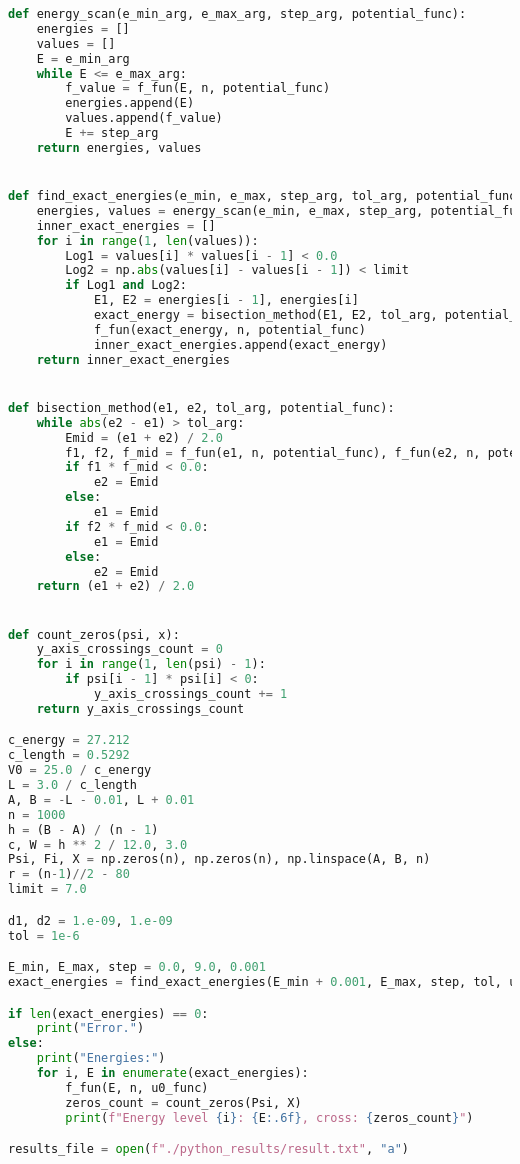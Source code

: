 \begin{lstlisting}[language=Python, caption=Код файла solver.py,label={lst:solver}]
def energy_scan(e_min_arg, e_max_arg, step_arg, potential_func):
    energies = []
    values = []
    E = e_min_arg
    while E <= e_max_arg:
        f_value = f_fun(E, n, potential_func)
        energies.append(E)
        values.append(f_value)
        E += step_arg
    return energies, values


def find_exact_energies(e_min, e_max, step_arg, tol_arg, potential_func):
    energies, values = energy_scan(e_min, e_max, step_arg, potential_func)
    inner_exact_energies = []
    for i in range(1, len(values)):
        Log1 = values[i] * values[i - 1] < 0.0
        Log2 = np.abs(values[i] - values[i - 1]) < limit
        if Log1 and Log2:
            E1, E2 = energies[i - 1], energies[i]
            exact_energy = bisection_method(E1, E2, tol_arg, potential_func)
            f_fun(exact_energy, n, potential_func)
            inner_exact_energies.append(exact_energy)
    return inner_exact_energies


def bisection_method(e1, e2, tol_arg, potential_func):
    while abs(e2 - e1) > tol_arg:
        Emid = (e1 + e2) / 2.0
        f1, f2, f_mid = f_fun(e1, n, potential_func), f_fun(e2, n, potential_func), f_fun(Emid, n, potential_func)
        if f1 * f_mid < 0.0:
            e2 = Emid
        else:
            e1 = Emid
        if f2 * f_mid < 0.0:
            e1 = Emid
        else:
            e2 = Emid
    return (e1 + e2) / 2.0


def count_zeros(psi, x):
    y_axis_crossings_count = 0
    for i in range(1, len(psi) - 1):
        if psi[i - 1] * psi[i] < 0:
            y_axis_crossings_count += 1
    return y_axis_crossings_count

c_energy = 27.212
c_length = 0.5292
V0 = 25.0 / c_energy
L = 3.0 / c_length
A, B = -L - 0.01, L + 0.01
n = 1000
h = (B - A) / (n - 1)
c, W = h ** 2 / 12.0, 3.0
Psi, Fi, X = np.zeros(n), np.zeros(n), np.linspace(A, B, n)
r = (n-1)//2 - 80
limit = 7.0

d1, d2 = 1.e-09, 1.e-09
tol = 1e-6

E_min, E_max, step = 0.0, 9.0, 0.001
exact_energies = find_exact_energies(E_min + 0.001, E_max, step, tol, u0_func)

if len(exact_energies) == 0:
    print("Error.")
else:
    print("Energies:")
    for i, E in enumerate(exact_energies):
        f_fun(E, n, u0_func)
        zeros_count = count_zeros(Psi, X)
        print(f"Energy level {i}: {E:.6f}, cross: {zeros_count}")

results_file = open(f"./python_results/result.txt", "a")



\end{lstlisting}
